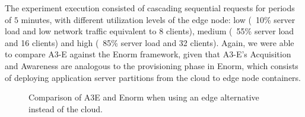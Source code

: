 The experiment execution consisted of cascading sequential requests for periods of $5$ minutes, with different utilization levels of the edge node: low (~10\% server load and low network traffic equivalent to 8 clients), medium (~55\% server load and 16 clients) and high (~85\% server load and 32 clients). Again, we were able to compare A3-E against the Enorm framework, given that A3-E's Acquisition and Awareness are analogous to the provisioning phase in Enorm, which consists of deploying application server partitions from the cloud to edge node containers. 

\begin{figure}[htb]
	\centering
	\captionsetup[subfigure]{width=0.49\textwidth}
	\captionsetup[subfigure]{width=0.49\textwidth}
	
	\caption{Comparison of A3E and Enorm when using an edge alternative instead of the cloud.} \label{fig:exp-a3e-enorm}
\end{figure}


